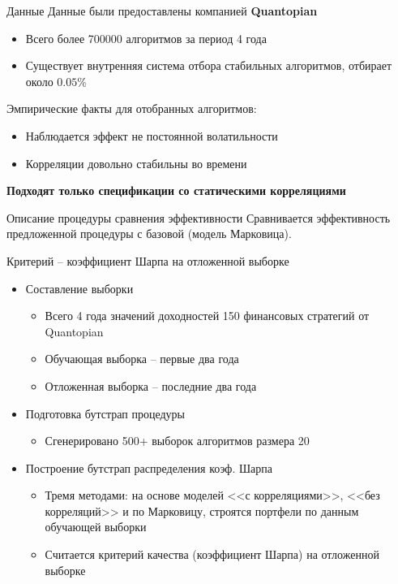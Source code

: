\documentclass[12pt]{beamer}
\begin{document}
\begin{frame}{Данные}
Данные были предоставлены компанией \textbf{Quantopian}
\begin{itemize}
	\item Всего более 700000 алгоритмов за период 4 года
	\item Существует внутренняя система отбора стабильных алгоритмов, отбирает около $0.05\%$
\end{itemize}
Эмпирические факты для отобранных алгоритмов:
\begin{itemize}
\item Наблюдается эффект не постоянной волатильности
	\item Корреляции довольно стабильны во времени
\end{itemize}
\textbf{Подходят только спецификации со статическими корреляциями}
\end{frame}
\begin{frame}{Описание процедуры сравнения эффективности}
Сравнивается эффективность предложенной процедуры с базовой (модель Марковица).

Критерий -- коэффициент Шарпа на отложенной выборке
\begin{itemize}
	\item Составление выборки
	\begin{itemize}
		\item Всего 4 года значений доходностей 150 финансовых стратегий от Quantopian
		\item Обучающая выборка -- первые два года
		\item Отложенная выборка -- последние два года
	\end{itemize}
	\item Подготовка бутстрап процедуры
	\begin{itemize}
		\item Сгенерировано 500+ выборок алгоритмов размера 20
	\end{itemize}
	\item Построение бутстрап распределения коэф. Шарпа
	\begin{itemize}
		\item Тремя методами: на основе моделей <<с корреляциями>>, <<без корреляций>> и по Марковицу, строятся портфели по данным обучающей выборки
		\item Считается критерий качества (коэффициент Шарпа) на отложенной выборке
	\end{itemize}
\end{itemize}
\end{frame}
\end{document}
